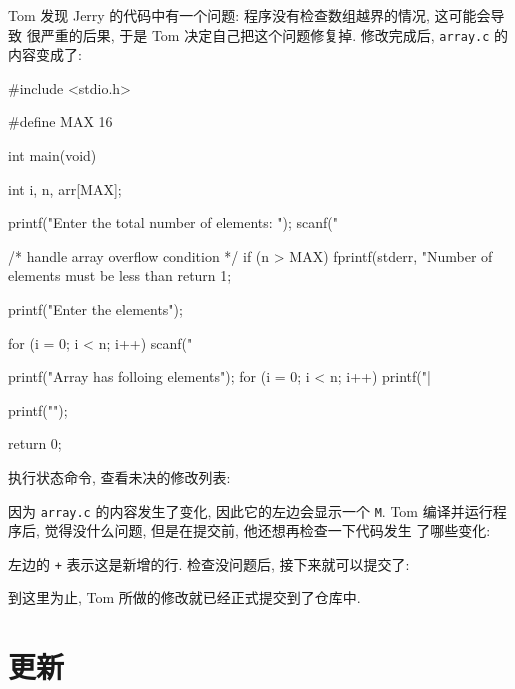 \documentclass[nofonts, oneside]{ctexbook}
\newcommand\svn{\texttt{svn}}
\newcommand\svnci{\texttt{commit}}
\newcommand\svnst{\texttt{status}}
\newcommand\svndf{\texttt{diff}}
\begin{document}
Tom 发现 Jerry 的代码中有一个问题: 程序没有检查数组越界的情况, 这可能会导致
很严重的后果, 于是 Tom 决定自己把这个问题修复掉. 修改完成后, \texttt{array.c}
的内容变成了:
\begin{ccode}
#include <stdio.h>

#define MAX 16

int main(void)
{
	int i, n, arr[MAX];

	printf("Enter the total number of elements: ");
	scanf("%

	/* handle array overflow condition */
	if (n > MAX) {
		fprintf(stderr, "Number of elements must be less than %
		return 1;
	}

	printf("Enter the elements\n");

	for (i = 0; i < n; i++)
		scanf("%

	printf("Array has folloing elements\n");
	for (i = 0; i < n; i++)
		printf("|%

	printf("\n");

	return 0;
}
\end{ccode}
执行状态命令, 查看未决的修改列表:
因为 \texttt{array.c} 的内容发生了变化, 因此它的左边会显示一个 \texttt{M}.
Tom 编译并运行程序后, 觉得没什么问题, 但是在提交前, 他还想再检查一下代码发生
了哪些变化:
左边的 \texttt{+} 表示这是新增的行. 检查没问题后, 接下来就可以提交了:
到这里为止, Tom 所做的修改就已经正式提交到了仓库中.

\chapter{更新}
\label{chap:update_process}
\end{document}
